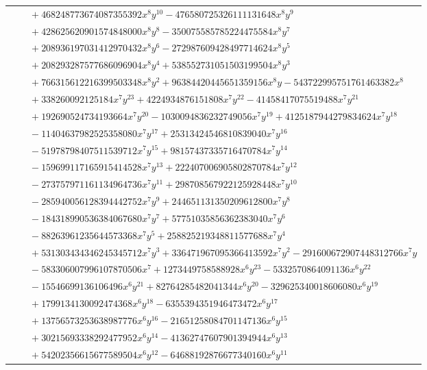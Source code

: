 \documentclass[11pt]{article}
\begin{document}
\begin{longtable}{@{}ll@{}}
 & $\quad +468248773674087355392x^{8}y^{10}-476580725326111131648x^{8}y^{9}$\\
 & $\quad +428625620901574848000x^{8}y^{8}-350075585785224475584x^{8}y^{7}$\\
 & $\quad +208936197031412970432x^{8}y^{6}-272987609428497714624x^{8}y^{5}$\\
 & $\quad +208293287577686096904x^{8}y^{4}+538552731051503199504x^{8}y^{3}$\\
 & $\quad +766315612216399503348x^{8}y^{2}+96384420445651359156x^{8}y-543722995751761463382x^{8}$\\
 & $\quad +338260092125184x^{7}y^{23}+4224934876151808x^{7}y^{22}-41458417075519488x^{7}y^{21}$\\
 & $\quad +192690524734193664x^{7}y^{20}-1030094836232749056x^{7}y^{19}+4125187944279834624x^{7}y^{18}$\\
 & $\quad -11404637982525358080x^{7}y^{17}+25313424546810839040x^{7}y^{16}$\\
 & $\quad -51978798407511539712x^{7}y^{15}+98157437335716470784x^{7}y^{14}$\\
 & $\quad -159699117165915414528x^{7}y^{13}+222407006905802870784x^{7}y^{12}$\\
 & $\quad -273757971161134964736x^{7}y^{11}+298708567922125928448x^{7}y^{10}$\\
 & $\quad -285940056128394442752x^{7}y^{9}+244651131350209612800x^{7}y^{8}$\\
 & $\quad -184318990536384067680x^{7}y^{7}+57751035856362383040x^{7}y^{6}$\\
 & $\quad -88263961235644573368x^{7}y^{5}+258825219348811577688x^{7}y^{4}$\\
 & $\quad +531303434346245345712x^{7}y^{3}+336471967095366413592x^{7}y^{2}-291600672907448312766x^{7}y$\\
 & $\quad -583306007996107870506x^{7}+1273449758588928x^{6}y^{23}-5332570864091136x^{6}y^{22}$\\
 & $\quad -15546699136106496x^{6}y^{21}+82764285482041344x^{6}y^{20}-329625340018606080x^{6}y^{19}$\\
 & $\quad +1799134130092474368x^{6}y^{18}-6355394351946473472x^{6}y^{17}$\\
 & $\quad +13756573253638987776x^{6}y^{16}-21651258084701147136x^{6}y^{15}$\\
 & $\quad +30215693338292477952x^{6}y^{14}-41362747607901394944x^{6}y^{13}$\\
 & $\quad +54202356615677589504x^{6}y^{12}-64688192876677340160x^{6}y^{11}$\\

\end{longtable}
\end{document}
